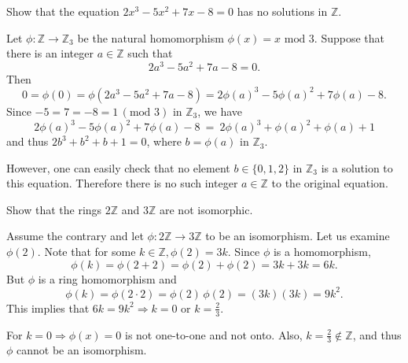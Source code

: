 \begin{example}
    Show that the equation $2x^3 - 5x^2 + 7x - 8 = 0$ has no solutions in $\mathbb{Z}$.
\end{example}
\begin{solution}
    Let $\phi: \mathbb{Z} \to \mathbb{Z}_3$ be the natural homomorphism $\phi(x) = x \text{ mod } 3$. Suppose that there 
    is an integer $a \in \mathbb{Z}$ such that
    \[
        2a^3 - 5a^2 + 7a - 8 = 0.
    \]
    Then 
    \[
        0 = \phi(0) = \phi(2a^3 - 5a^2 + 7a - 8) = 2\phi(a)^3 - 5\phi(a)^2 + 7\phi(a) - 8.
    \]
    Since $-5 = 7 = -8 = 1 \, (\text{mod }3)$ in $\mathbb{Z}_3$, we have 
    \[
        2\phi(a)^3 - 5\phi(a)^2 + 7\phi(a) - 8 \> = \> 2\phi(a)^3 + \phi(a)^2 + \phi(a) + 1
    \]
    and thus $2b^3 + b^2 + b + 1 = 0$, where $b = \phi(a)$ in $\mathbb{Z}_3$.

    However, one can easily check that no element $b \in \{ 0, 1, 2 \}$ in $\mathbb{Z}_3$ is a solution to this equation. 
    Therefore there is no such integer $a \in \mathbb{Z}$ to the original equation.
\end{solution}

\begin{example}[Tutorial]
    Show that the rings $2 \mathbb{Z}$ and $3 \mathbb{Z}$ are not isomorphic.
\end{example}
\begin{solution}
    Assume the contrary and let $\phi: 2 \mathbb{Z} \to 3\mathbb{Z}$ to be an isomorphism. Let us examine 
    $\phi(2)$. Note that for some $k \in \mathbb{Z}, \phi(2) = 3k$. Since $\phi$ is a homomorphism, 
    \[
        \phi(k) = \phi(2 + 2) = \phi(2) + \phi(2) = 3k + 3k = 6k.
    \]
    But $\phi$ is a ring homomorphism and 
    \[
        \phi(k) = \phi(2 \cdot 2) = \phi(2)\, \phi(2) = (3k)(3k) = 9k^2.
    \]
    This implies that $6k = 9k^2 \Longrightarrow k = 0$ or $k = \frac{2}{3}$.

    For $k = 0 \Longrightarrow \phi(x) = 0$ is not one-to-one and not onto. Also, $k = \frac{2}{3} \notin \mathbb{Z}$, and thus 
    $\phi$ cannot be an isomorphism.
\end{solution}

